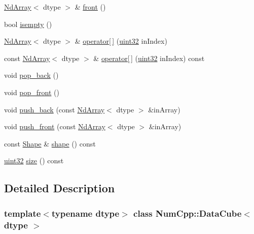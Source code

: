 \begin{DoxyCompactItemize}
\mbox{\hyperlink{class_num_cpp_1_1_nd_array}{Nd\+Array}}$<$ dtype $>$ \& \mbox{\hyperlink{class_num_cpp_1_1_data_cube_ae8600af2e99651a2623b0470fd328e66}{front}} ()
\item 
bool \mbox{\hyperlink{class_num_cpp_1_1_data_cube_afe059f314921bb415ef38b637d4ba9e3}{isempty}} ()
\item 
\mbox{\hyperlink{class_num_cpp_1_1_nd_array}{Nd\+Array}}$<$ dtype $>$ \& \mbox{\hyperlink{class_num_cpp_1_1_data_cube_ad99626cc18561e39f0ec9f8c49c56de5}{operator\mbox{[}$\,$\mbox{]}}} (\mbox{\hyperlink{namespace_num_cpp_a36f388e948380413c63011cab9b7fbd5}{uint32}} in\+Index)
\item 
const \mbox{\hyperlink{class_num_cpp_1_1_nd_array}{Nd\+Array}}$<$ dtype $>$ \& \mbox{\hyperlink{class_num_cpp_1_1_data_cube_a891411d7c787f5fb927f1d8269b84ec8}{operator\mbox{[}$\,$\mbox{]}}} (\mbox{\hyperlink{namespace_num_cpp_a36f388e948380413c63011cab9b7fbd5}{uint32}} in\+Index) const
\item 
void \mbox{\hyperlink{class_num_cpp_1_1_data_cube_abd05ee2c3189193733607b4a19813a8b}{pop\+\_\+back}} ()
\item 
void \mbox{\hyperlink{class_num_cpp_1_1_data_cube_a815b84d602a0cc59b4b96b6734d8e526}{pop\+\_\+front}} ()
\item 
void \mbox{\hyperlink{class_num_cpp_1_1_data_cube_a0521c70a8a6cd5fc95faf1c526b7b228}{push\+\_\+back}} (const \mbox{\hyperlink{class_num_cpp_1_1_nd_array}{Nd\+Array}}$<$ dtype $>$ \&in\+Array)
\item 
void \mbox{\hyperlink{class_num_cpp_1_1_data_cube_a49c36ab206417ae30908145b4a2a001a}{push\+\_\+front}} (const \mbox{\hyperlink{class_num_cpp_1_1_nd_array}{Nd\+Array}}$<$ dtype $>$ \&in\+Array)
\item 
const \mbox{\hyperlink{class_num_cpp_1_1_shape}{Shape}} \& \mbox{\hyperlink{class_num_cpp_1_1_data_cube_a095037bf46062430413ef8ac9bb2dd2d}{shape}} () const
\item 
\mbox{\hyperlink{namespace_num_cpp_a36f388e948380413c63011cab9b7fbd5}{uint32}} \mbox{\hyperlink{class_num_cpp_1_1_data_cube_aee2e2c47bc592149dfb4719613058b28}{size}} () const
\end{DoxyCompactItemize}


\subsection{Detailed Description}
\subsubsection*{template$<$typename dtype$>$\newline
class Num\+Cpp\+::\+Data\+Cube$<$ dtype $>$}

